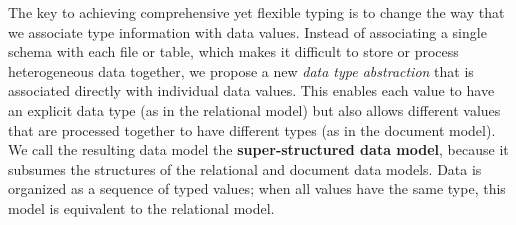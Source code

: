 

The key to achieving comprehensive yet flexible typing is to change the way that we associate type information with data values. Instead of associating a single schema with each file or table, which makes it difficult to store or process heterogeneous data together, we propose a new {\em data type abstraction} that is associated directly with individual data values. This enables each value to have an explicit data type (as in the relational model) but also allows different values that are processed together to have different types (as in the document model). We call the resulting data model the {\bf super-structured data model}, because it subsumes the structures of the relational and document data models. Data is organized as a sequence of typed values; when all values have the same type, this model is equivalent to the relational model.

